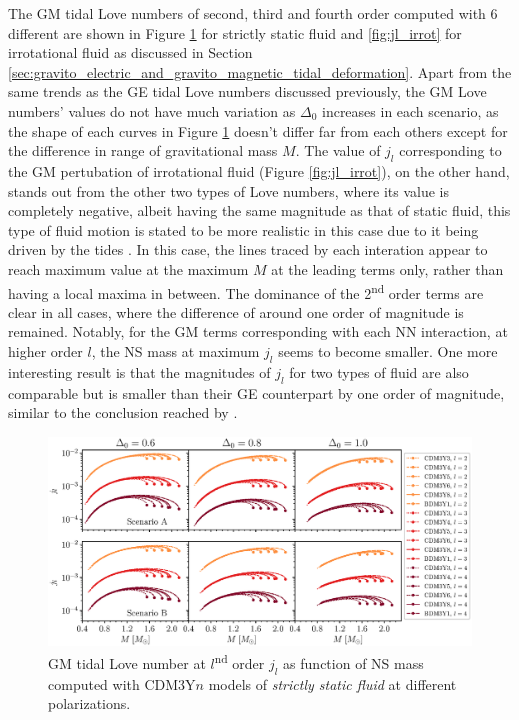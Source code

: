 The \gls{GM} tidal Love numbers of second, third and fourth order computed with 6 different  are shown in Figure \ref{fig:jl_stat} for strictly static fluid and \ref{fig:jl_irrot} for irrotational fluid as discussed in Section \ref{sec:gravito_electric_and_gravito_magnetic_tidal_deformation}. Apart from the same trends as the \gls{GE} tidal Love numbers discussed previously, the \gls{GM} Love numbers' values do not have much variation as $\Delta_0$ increases in each scenario, as the shape of each curves in Figure \ref{fig:jl_stat} doesn't differ far from each others except for the difference in range of gravitational mass $M$. The value of $j_l$ corresponding to the \gls{GM} pertubation of irrotational fluid (Figure \ref{fig:jl_irrot}), on the other hand, stands out from the other two types of Love numbers, where its value is completely negative, albeit having the same magnitude as that of static fluid, this type of fluid motion is stated to be more realistic in this case due to it being driven by the tides \citep{perot2021role,pani2018magnetic}. In this case, the lines traced by each interation appear to reach maximum value at the maximum $M$ at the leading terms only, rather than having a local maxima in between. The dominance of the 2\textsuperscript{nd} order terms are clear in all cases, where the difference of around one order of magnitude is remained. Notably, for the \gls{GM} terms corresponding with each \gls{NN} interaction, at higher order $l$, the \gls{NS} mass at maximum $j_l$ seems to become smaller. One more interesting result is that the magnitudes of $j_l$ for two types of fluid are also comparable but is smaller than their \gls{GE} counterpart by one order of magnitude, similar to the conclusion reached by \cite{perot2021role}.
\begin{figure}[ht!]
        \centering
        \includegraphics[width=\textwidth]{fig/jl_stat.eps}
        \caption{\gls{GM} tidal Love number at $l$\textsuperscript{nd} order $j_l$ as function of \gls{NS} mass computed with CDM3Y$n$ models of \emph{strictly static fluid} at different polarizations.}
        \label{fig:jl_stat}
\end{figure} 
